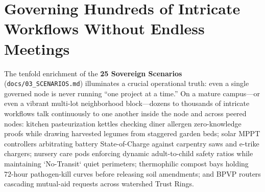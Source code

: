 \section*{Governing Hundreds of Intricate Workflows Without Endless Meetings}

The tenfold enrichment of the \textbf{25 Sovereign Scenarios} (\texttt{docs/03\_SCENARIOS.md})
illuminates a crucial operational truth: even a single governed node is never running ``one
project at a time.'' On a mature campus---or even a vibrant multi-lot neighborhood block---dozens
to thousands of intricate workflows talk continuously to one another inside the node and across
peered nodes: kitchen pasteurization kettles checking diner allergen zero-knowledge proofs while
drawing harvested legumes from staggered garden beds; solar MPPT controllers arbitrating battery
State-of-Charge against carpentry saws and e-trike chargers; nursery care pods enforcing dynamic
adult-to-child safety ratios while maintaining `No-Transit` quiet perimeters; thermophilic
compost bays holding $72\text{-hour}$ pathogen-kill curves before releasing soil amendments; and
BPVP routers cascading mutual-aid requests across watershed Trust Rings.

\begin{table}[htbp]
\centering
\caption{High-Density Governance Scale, Memory Footprint, and Human Deliberation Load Across Node Maturation Stages}
\label{tab:preface-l5-density}
\small
{}
\end{table}

